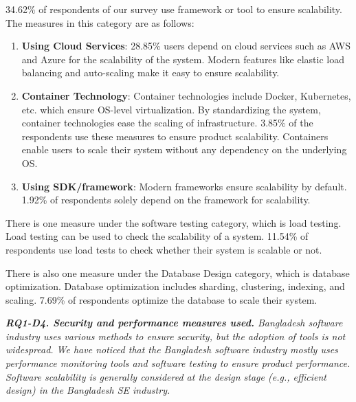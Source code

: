 34.62\% of respondents of our survey use framework or tool to ensure scalability. The measures in this category are as follows:
\begin{enumerate}[label=(\alph*)]

    \item \textbf{Using Cloud Services}: 28.85\% users depend on cloud services such as AWS and Azure for the scalability of the system. Modern features like elastic load balancing and auto-scaling make it easy to ensure scalability.
    
    \item \textbf{Container Technology}: Container technologies include Docker, Kubernetes, etc. which ensure OS-level virtualization. By standardizing the system, container technologies ease the scaling of infrastructure. 3.85\% of the respondents use these measures to ensure product scalability. Containers enable users to scale their system without any dependency on the underlying OS.
    
    \item \textbf{Using SDK/framework}: Modern frameworks ensure scalability by default. 1.92\% of respondents solely depend on the framework for scalability.
  
\end{enumerate}
 
 
There is one measure under the software testing category, which is load testing. Load testing can be used to check the scalability of a system. 11.54\% of respondents use load tests to check whether their system is scalable or not.

There is also one measure under the Database Design category, which is database optimization. Database optimization includes sharding, clustering, indexing, and scaling. 7.69\% of respondents optimize the database to scale their system.
\begin{tcolorbox}[flushleft upper,boxrule=1pt,arc=0pt,left=0pt,right=0pt,top=0pt,bottom=0pt,colback=white,after=\ignorespacesafterend\par\noindent]
\nd\it{\bf{RQ1-D4. Security and performance measures used.}} Bangladesh software
industry uses various methods to ensure security, but the adoption of tools is not widespread. 
We have noticed that the Bangladesh
software industry mostly uses performance monitoring tools and software testing
to ensure product performance. Software scalability is generally considered at
the design stage (e.g., efficient design) in the Bangladesh SE industry. 
\end{tcolorbox}